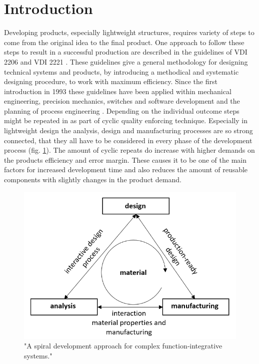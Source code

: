 \section{\label{sec:SoA}Introduction}
Developing products, especially lightweight structures, 
requires variety of steps to come from the original idea to the final product.
One approach to follow these steps to result in a successful production 
are described in the guidelines of VDI 2206 \cite{gausmeier2002} and VDI 2221 \cite{Jansch2006THEDO}.
These guidelines give a general methodology for designing technical systems and products, 
by introducing a methodical and systematic designing procedure, to work with maximum efficiency.
Since the first introduction in 1993 these guidelines have been applied within mechanical engineering, precision mechanics, 
switches and software development and the planning of process engineering \cite{pahl_beitz_2013}. 
Depending on the individual outcome steps might be repeated in as part of cyclic quality enforcing technique.
Especially in lightweight design the analysis, design and manufacturing processes are so strong connected, 
that they all have to be considered in every phase of the development process (fig. \ref{pic:interactive-design}).
The amount of cyclic repeats do increase with higher demands on the products efficiency and error margin.
These causes it to be one of the main factors for increased development time and 
also reduces the amount of reusable components with slightly changes in the product demand.\\
\begin{figure}[h]
    \centering
    \includegraphics[scale=0.5]{pics/interactive-design.PNG}
    \caption{\label{pic:interactive-design} "A spiral development approach for complex function‐integrative systems." \cite{bohm_interaktiver_2020}}
\end{figure}\\

